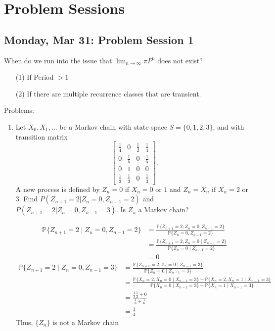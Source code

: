\documentclass[10pt, oneside]{article}
\newcommand{\bbP}{\mathbb{P}}
\theoremstyle{definition}
\begin{document}
\newpage
\section{Problem Sessions}
\subsection{Monday, Mar 31: Problem Session 1}
When do we run into the issue that $\lim_{n\to \infty}\pi P^n$ does not exist? 
\begin{enumerate}
    \item[(1)] If Period $> 1$
    \item[(2)] If there are multiple recurrence classes that are transient.
\end{enumerate}

Problems:
\begin{enumerate}
    \item Let $X_0, X_1, \dots$ be a Markov chain with state space $S = \{0, 1, 2, 3\}$, and with transition matrix
    \[
    \begin{bmatrix}
        \frac{1}{4} & 0 & \frac{1}{2} & \frac{1}{4} \\
        0 &  \frac{1}{5} & 0 & \frac{1}{5} \\
        0 & 1 & 0 & 0 \\
        \frac{1}{3} & \frac{1}{3} & 0 & \frac{1}{3}
    \end{bmatrix}.
    \]
    A new process is defined by $Z_n = 0$ if $X_n = 0$ or $1$ and $Z_n = X_n$ if $X_n = 2$ or $3$. Find $P(Z_{n+1} = 2 | Z_n = 0, Z_{n-1} = 2)$ and $P(Z_{n+1} = 2 | Z_n = 0, Z_{n-1} = 3)$. Is $Z_n$ a Markov chain?
    \begin{solution}
    \begin{align*}
        \bbP\{Z_{n + 1}= 2 \mid Z_n = 0, Z_{n-1} = 2\} &= \frac{\bbP\{Z_{n + 1} = 2, Z_{n} = 0, Z_{n-1} = 2\}}{\bbP\{Z_n = 0, Z_{n-1 } = 2\}}\\
        &= \frac{\bbP\{Z_{n + 1} = 2, Z_{n} = 0 \mid Z_{n-1} =2\}}{\bbP\{Z_n = 0 \mid Z_{n-1} = 2\}}\\
        &= 0
    \end{align*}
    \begin{align*}
        \bbP\{Z_{n + 1} = 2 \mid Z_n = 0, Z_{n-1} = 3\} &= \frac{\bbP\{Z_{n + 1} = 2, Z_{n} = 0 \mid Z_{n-1} =3\}}{\bbP\{Z_n = 0 \mid Z_{n-1} = 3\}}\\
        &= \frac{\bbP\{X_n = 2, X_n = 0 \mid X_{n-1} = 3\} +\bbP\{X_n = 2, X_n = 1 \mid X_{n-1} = 3\}}{\bbP\{X_n = 0 \mid X_{n-1} =3\} + \bbP\{X_{n} = 1 \mid X_{n-1} = 3\}}\\
        &= \frac{\frac{1}{3}\frac{1}{2} + 0}{\frac{1}{6} + \frac{1}{6}}\\
        &= \frac{1}{4}
    \end{align*}
    Thus, $\{Z_n\}$ is not a Markov chain
    \end{solution}


\end{enumerate}
\end{document}
